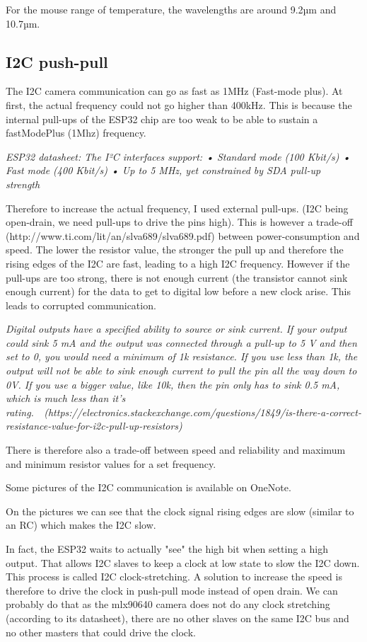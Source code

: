 \documentclass[a4paper]{article}
\begin{document}
For the mouse range of temperature, the wavelengths are around 9.2µm and 10.7µm.

\subsection{I2C push-pull}
The I2C camera communication can go as fast as 1MHz (Fast-mode plus). At first, the actual frequency could not go higher than 400kHz. This is because the internal pull-ups of the ESP32 chip are too weak to be able to sustain a fastModePlus (1Mhz) frequency. 


\textit{ESP32 datasheet: The I²C interfaces support: • Standard mode (100 Kbit/s) • Fast mode (400 Kbit/s) • Up to 5 MHz, yet constrained by SDA pull-up strength }

Therefore to increase the actual frequency, I used external pull-ups. (I2C being open-drain, we need pull-ups to drive the pins high).
This is however a trade-off (http://www.ti.com/lit/an/slva689/slva689.pdf) between power-consumption and speed.
The lower the resistor value, the stronger the pull up and therefore the rising edges of the I2C are fast, leading to a high I2C frequency. However if the pull-ups are too strong, there is not enough current (the transistor cannot sink enough current) for the data to get to digital low before a new clock arise. This leads to corrupted communication.

\textit{Digital outputs have a specified ability to source or sink current. If your output could sink 5 mA and the output was connected through a pull-up to 5 V and then set to 0, you would need a minimum of 1k resistance. If you use less than 1k, the output will not be able to sink enough current to pull the pin all the way down to 0V. If you use a bigger value, like 10k, then the pin only has to sink 0.5 mA, which is much less than it's rating.  (https://electronics.stackexchange.com/questions/1849/is-there-a-correct-resistance-value-for-i2c-pull-up-resistors)
}

There is therefore also a trade-off between speed and reliability and maximum and minimum resistor values for a set frequency.


Some pictures of the I2C communication is available on OneNote.

On the pictures we can see that the clock signal rising edges are slow (similar to an RC) which makes the I2C slow.

In fact, the ESP32 waits to actually "see" the high bit when setting a high output. That allows I2C slaves to keep a clock at low state to slow the I2C down. This process is called I2C clock-stretching.
A solution to increase the speed is therefore to drive the clock in push-pull mode instead of open drain. We can probably do that as the mlx90640 camera does not do any clock stretching (according to its datasheet), there are no other slaves on the same I2C bus and no other masters that could drive the clock.
\end{document}
